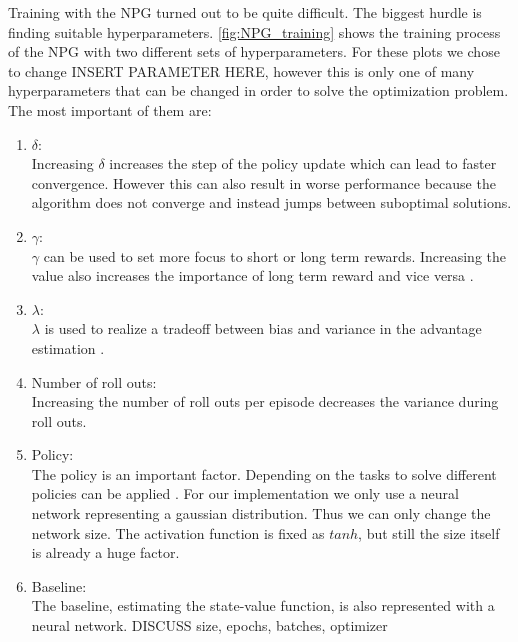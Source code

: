 Training with the NPG turned out to be quite difficult. The biggest hurdle is finding suitable hyperparameters. \autoref{fig:NPG_training} shows the training process of the NPG with two different sets of hyperparameters. For these plots we chose to change INSERT PARAMETER HERE, however this is only one of many hyperparameters that can be changed in order to solve the optimization problem. The most important of them are:
\begin{enumerate}
  \item $\delta$: \\
  Increasing $\delta$ increases the step of the policy update which can lead to faster convergence. However this can also result in worse performance because the algorithm does not converge and instead jumps between suboptimal solutions. \\
  \item $\gamma$: \\
  $\gamma$ can be used to set more focus to short or long term rewards. Increasing the value also increases the importance of long term reward and vice versa \cite{He2018}. \\
  \item $\lambda$: \\
  $\lambda$ is used to realize a tradeoff between bias and variance in the advantage estimation \cite{He2018}. \\
  \item Number of roll outs: \\
  Increasing the number of roll outs per episode decreases the variance during roll outs. \\
  \item Policy: \\
  The policy is an important factor. Depending on the tasks to solve different policies can be applied \cite{Rajeswaran2017}. For our implementation we only use a neural network representing a gaussian distribution. Thus we can only change the network size. The activation function is fixed as $tanh$, but still the size itself is already a huge factor. \\
  \item Baseline: \\
  The baseline, estimating the state-value function, is also represented with a neural network. DISCUSS size, epochs, batches, optimizer
\end{enumerate}
